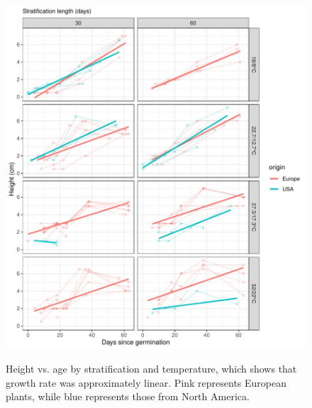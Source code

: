 \documentclass[12pt]{article}\usepackage[]{graphicx}\usepackage[]{color}
\begin{document}
\begin{figure}[H]
  {\includegraphics[scale=.5, page=7, trim=0cm 0cm 0cm 0cm, clip=TRUE]{supplement.pdf}}
  \caption{Height vs. age by stratification and temperature, which shows that growth rate was approximately linear.  Pink represents European plants, while blue represents those from  North America.}\label{fig:lmgr}
\end{figure}
\end{document}
